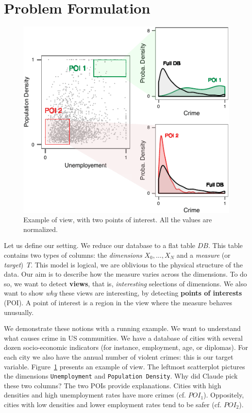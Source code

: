 \section{Problem Formulation}
\label{sec:presentation}
\begin{figure}[t!]
\centering
\includegraphics[width=\columnwidth]{images/Overview}
\caption{Example of view, with two points of interest. All the values
are normalized.}
\label{fig:overview}
\end{figure}
Let us define our setting. We reduce our database to a flat table $DB$. This
table contains two types of columns: the \emph{dimensions} $X_0, \ldots, X_N$
and a \emph{measure} (or \emph{target})~$T$. This model is logical, we
are oblivious to the physical structure of the data. Our aim is to describe how
the measure varies across the dimensions. To do so, we want to detect
\textbf{views}, that is, \emph{interesting} selections of dimensions. We also
want to show \emph{why} these views are interesting, by detecting
\textbf{points of interests} (POI). A point of interest is a region in the view
where the measure behaves unusually.

We demonstrate these notions with a running example. We want to understand what
causes crime in US communities. We have a database of cities with several dozen
socio-economic indicators (for instance, employment, age, or diplomas). For
each city we also have the annual number of violent crimes: this is our target
variable. Figure~\ref{fig:overview} presents an example of view. The leftmost
scatterplot pictures the dimensions \texttt{Unemployment} and
\texttt{Population Density}. Why did Claude pick these two columns? The two
POIs provide explanations. Cities with high densities and high unemployment
rates have more crimes (cf. $POI_1$).  Oppositely, cities with low densities
and lower employment rates tend to be safer (cf.  $POI_2$).

